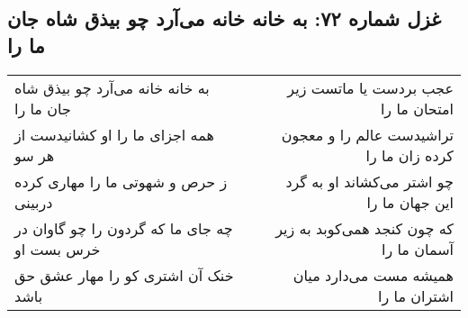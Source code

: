 \begin{center}
\section*{غزل شماره ۷۲: به خانه خانه می‌آرد چو بیذق شاه جان ما را}
\label{sec:0072}
\begin{longtable}{l p{0.5cm} r}
به خانه خانه می‌آرد چو بیذق شاه جان ما را
&&
عجب بردست یا ماتست زیر امتحان ما را
\\
همه اجزای ما را او کشانیدست از هر سو
&&
تراشیدست عالم را و معجون کرده زان ما را
\\
ز حرص و شهوتی ما را مهاری کرده دربینی
&&
چو اشتر می‌کشاند او به گرد این جهان ما را
\\
چه جای ما که گردون را چو گاوان در خرس بست او
&&
که چون کنجد همی‌کوبد به زیر آسمان ما را
\\
خنک آن اشتری کو را مهار عشق حق باشد
&&
همیشه مست می‌دارد میان اشتران ما را
\\
\end{longtable}
\end{center}
